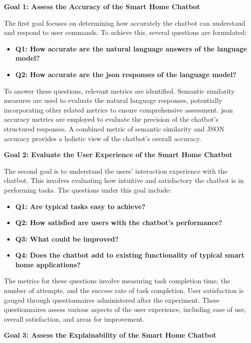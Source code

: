 \textbf{Goal 1: Assess the Accuracy of the Smart Home Chatbot}

The first goal focuses on determining how accurately the chatbot can understand and respond to user commands. To achieve this, several questions are formulated:

\begin{itemize}
    \item \textbf{Q1: How accurate are the natural language answers of the language model?}
    \item \textbf{Q2: How accurate are the \gls{json} responses of the language model?}
\end{itemize}

To answer these questions, relevant metrics are identified. Semantic similarity measures are used to evaluate the natural language responses, potentially incorporating other related metrics to ensure comprehensive assessment. \gls{json} accuracy metrics are employed to evaluate the precision of the chatbot's structured responses. A combined metric of semantic similarity and JSON accuracy provides a holistic view of the chatbot's overall accuracy.

\textbf{Goal 2: Evaluate the User Experience of the Smart Home Chatbot}

The second goal is to understand the users' interaction experience with the chatbot. This involves evaluating how intuitive and satisfactory the chatbot is in performing tasks. The questions under this goal include:

\begin{itemize}
    \item \textbf{Q1: Are typical tasks easy to achieve?}
    \item \textbf{Q2: How satisfied are users with the chatbot's performance?}
    \item \textbf{Q3: What could be improved?}
    \item \textbf{Q4: Does the chatbot add to existing functionality of typical smart home applications?}
\end{itemize}

The metrics for these questions involve measuring task completion time, the number of attempts, and the success rate of task completion. User satisfaction is gauged through questionnaires administered after the experiment. These questionnaires assess various aspects of the user experience, including ease of use, overall satisfaction, and areas for improvement.

\textbf{Goal 3: Assess the Explainability of the Smart Home Chatbot}

